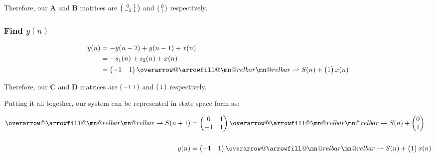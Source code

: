\documentclass{article}
\makeatletter
\renewcommand{\thesubsubsection}{\thesection.\alph{subsection}.\Roman{subsubsection}}
\DeclareRobustCommand{\overrightharpoon}{\mathpalette{\overarrow@\rightharpoonfill@}}
\def\rightharpoonfill@{\arrowfill@\mn@relbar\mn@relbar\rightharpoonup}
\makeatother
\begin{document}
Therefore, our $\boldsymbol{A}$ and $\boldsymbol{B}$ matrices are $\begin{psmallmatrix} 0 & 1 \\ -1 & 1 \end{psmallmatrix}$ and $\begin{psmallmatrix} 0 \\ 1 \end{psmallmatrix}$ respectively.

\subsubsection[~\thesubsubsection]{Find $y(n)$}

\begin{align*}
	y(n) &= -y(n - 2) + y(n - 1) + x(n) \\
	&= -s_1(n) + s_2(n) + x(n) \\
	&= \begin{pmatrix} -1 & 1 \end{pmatrix}\overrightharpoon{S(n)} + \begin{pmatrix} 1 \end{pmatrix}x(n)
\end{align*}

Therefore, our $\boldsymbol{C}$ and $\boldsymbol{D}$ matrices are $\begin{psmallmatrix} -1 & 1 \end{psmallmatrix}$ and $\begin{psmallmatrix} 1 \end{psmallmatrix}$ respectively.

Putting it all together, our system can be represented in state space form as:

\begin{align*}
	\overrightharpoon{S(n + 1)} &= \begin{pmatrix} 0 & 1 \\ -1 & 1 \end{pmatrix}\overrightharpoon{S(n)} + \begin{pmatrix} 0 \\ 1\end{pmatrix} \\\\
	y(n) &= \begin{pmatrix} -1 & 1\end{pmatrix}\overrightharpoon{S(n)} + \begin{pmatrix} 1 \end{pmatrix}x(n)
\end{align*}
\end{document}

